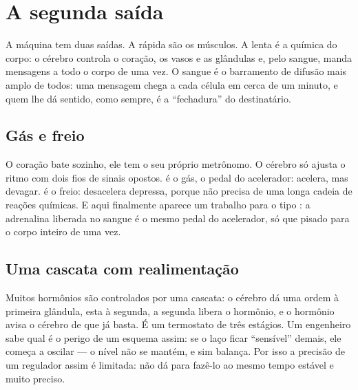 \chapter{A segunda saída}

A máquina tem duas saídas. A rápida são os músculos. A lenta é a química do corpo: o cérebro controla o coração, os vasos e as glândulas e, pelo sangue, manda mensagens a todo o corpo de uma vez. O sangue é o barramento de difusão mais amplo de todos: uma mensagem chega a cada célula em cerca de um minuto, e quem lhe dá sentido, como sempre, é a ``fechadura'' do destinatário.

\section*{Gás e freio}

O coração bate sozinho, ele tem o seu próprio metrônomo. O cérebro só ajusta o ritmo com dois fios de sinais opostos.  é o gás, o pedal do acelerador: acelera, mas devagar.  é o freio: desacelera depressa, porque não precisa de uma longa cadeia de reações químicas. E aqui finalmente aparece um trabalho para o tipo : a adrenalina liberada no sangue é o mesmo pedal do acelerador, só que pisado para o corpo inteiro de uma vez.


\section*{Uma cascata com realimentação}

Muitos hormônios são controlados por uma cascata: o cérebro dá uma ordem à primeira glândula, esta à segunda, a segunda libera o hormônio, e o hormônio avisa o cérebro de que já basta. É um termostato de três estágios. Um engenheiro sabe qual é o perigo de um esquema assim: se o laço ficar ``sensível'' demais, ele começa a oscilar --- o nível não se mantém, e sim balança. Por isso a precisão de um regulador assim é limitada: não dá para fazê-lo ao mesmo tempo estável e muito preciso.

